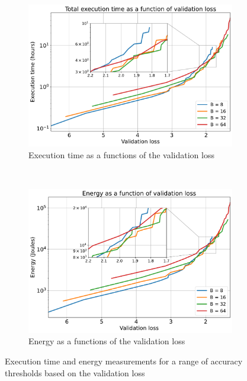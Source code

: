 \documentclass{article}
\begin{document}
{        \begin{figure}[H]
            \centering
            \begin{subfigure}[b]{0.47 \textwidth}
                \includegraphics[trim = {0.0in 0.00in 0.0in 0.0in}, clip, width = 1.02 \textwidth]{../Figures/accuracy_vs_time_validation.pdf}
                \caption{Execution time as a functions of the validation loss}
                \label{fig:convergence_energy_validation}
            \end{subfigure}
            ~
            \begin{subfigure}[b]{0.47 \textwidth}
                \includegraphics[trim = {0.0in 0.0in 0.0in 0.0in}, clip, width = 1.0 \textwidth]{../Figures/accuracy_vs_energy_validation.pdf}
                \caption{Energy as a functions of the validation loss}
                \label{fig:convergence_energy_validation}
            \end{subfigure}
            \caption{Execution time and energy measurements for a range of accuracy thresholds based on the validation loss}
            \label{fig:accuracy_vs_energy_validation}
        \end{figure}
    }
\end{document}
